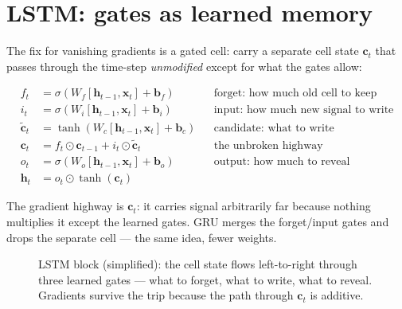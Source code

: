 \section{LSTM: gates as learned memory}
\label{sec:lstm}

The fix for vanishing gradients is a gated cell: carry a
separate cell state $\mathbf c_t$ that passes through the time-step
\emph{unmodified} except for what the gates allow:

\begin{align*}
f_t &= \sigma(W_f[\mathbf h_{t-1},\mathbf x_t]+\mathbf b_f)
  &&\text{forget: how much old cell to keep}\\
i_t &= \sigma(W_i[\mathbf h_{t-1},\mathbf x_t]+\mathbf b_i)
  &&\text{input: how much new signal to write}\\
\tilde{\mathbf c}_t &= \tanh(W_c[\mathbf h_{t-1},\mathbf x_t]+\mathbf b_c)
  &&\text{candidate: what to write}\\
\mathbf c_t &= f_t\odot\mathbf c_{t-1}+i_t\odot\tilde{\mathbf c}_t
  &&\text{the unbroken highway}\\
o_t &= \sigma(W_o[\mathbf h_{t-1},\mathbf x_t]+\mathbf b_o)
  &&\text{output: how much to reveal}\\
\mathbf h_t &= o_t\odot\tanh(\mathbf c_t)
\end{align*}

The gradient highway is $\mathbf c_t$: it carries signal arbitrarily
far because nothing multiplies it except the learned gates.
GRU merges the forget/input gates and drops the separate
cell --- the same idea, fewer weights.

\begin{figure}[htbp]
\centering
{}
\caption{LSTM block (simplified): the cell state flows left-to-right
through three learned gates --- what to forget, what to write, what to
reveal. Gradients survive the trip because the path through
$\mathbf c_t$ is additive.}
\label{fig:lstm}
\end{figure}

